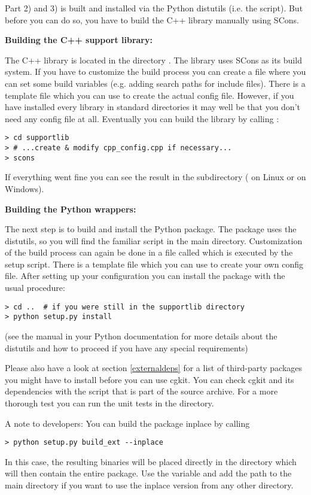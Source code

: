Part 2) and 3) is built and installed via the Python distutils (i.e.
the  script). But before you can do so, you have to
build the C++ library manually using SCons.

{\bf Building the C++ support library:}

The C++ library is located in the directory . The library
uses SCons as its build system. If you have to customize the build process
you can create a file  where you can set some build
variables (e.g. adding search paths for include files). There is a template
file  which you can use to create the actual
config file. However, if you have installed every library in standard
directories it may well be that you don't need any config file at all.
Eventually you can build the library by calling :

\begin{verbatim}
> cd supportlib
> # ...create & modify cpp_config.cpp if necessary...
> scons
\end{verbatim}

If everything went fine you can see the result in the 
subdirectory ( on Linux or  on Windows).

{\bf Building the Python wrappers:}

The next step is to build and install the Python package. The package
uses the distutils, so you will find the familiar 
script in the main directory. Customization of the build process can again
be done in a file called  which is executed by the setup
script. There is a template file  which you can
use to create your own config file. After setting up your
configuration you can install the package with the usual procedure:

\begin{verbatim}
> cd ..  # if you were still in the supportlib directory
> python setup.py install
\end{verbatim}

(see the manual  in your Python
documentation for more details about the distutils and how to proceed
if you have any special requirements)

Please also have a look at section \ref{externaldeps} for a list of
third-party packages you might have to install before you can use cgkit.
You can check cgkit and its dependencies with the script 
 that is part of the source archive.
For a more thorough test you can run the unit tests in the 
directory.

A note to developers: You can build the package inplace by calling

\begin{verbatim}
> python setup.py build_ext --inplace
\end{verbatim}

In this case, the resulting binaries will be placed directly in the
 directory which will then contain the entire package. Use
the  variable and add the path to the main
directory if you want to use the inplace version from any other
directory.
